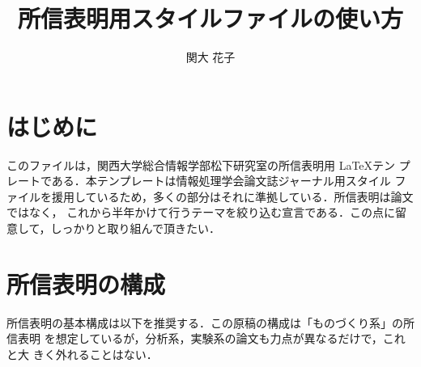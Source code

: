 \documentclass[a4j]{matsushita-zemi}
\title{所信表明用スタイルファイルの使い方}
\author{関大 花子}
\begin{document}
\maketitle

\section{はじめに}
\label{background} 

このファイルは，関西大学総合情報学部松下研究室の所信表明用 \LaTeX テン
プレートである．本テンプレートは情報処理学会論文誌ジャーナル用スタイル
ファイルを援用しているため，多くの部分はそれに準拠している．所信表明は論文ではなく，
これから半年かけて行うテーマを絞り込む宣言である．この点に留意して，しっかりと取り組んで頂きたい．

\section{所信表明の構成}
\label{works} 

所信表明の基本構成は以下を推奨する．この原稿の構成は「ものづくり系」の所信表明
を想定しているが，分析系，実験系の論文も力点が異なるだけで，これと大
きく外れることはない．
\end{document}
